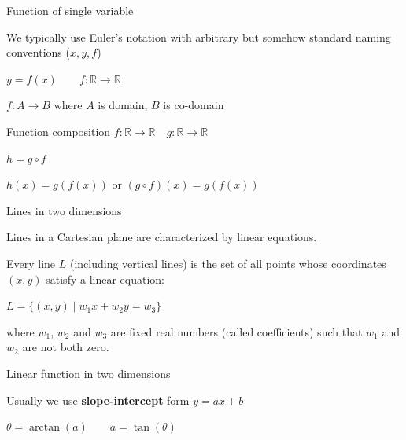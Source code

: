 \documentclass[12pt,aspectratio=169,handout]{beamer}
\begin{document}
\begin{frame}{Function of single variable}
	
	We typically use Euler's notation with arbitrary but somehow standard naming conventions ($x, y, f$)
	
	$y = f (x) \qquad f: \mathbb{R} \to \mathbb{R}$
	
	$f : A \to B$ where $A$ is domain, $B$ is co-domain
	
	\bigskip
	
	\begin{block}{Function composition}
		$f: \mathbb{R} \to \mathbb{R} \quad g: \mathbb{R} \to \mathbb{R}$
		
		$h = g \circ f$
		
		$h(x) = g(f(x))$ or $(g \circ f)(x)= g(f(x))$
	\end{block}
	
\end{frame}


\begin{frame}{Lines in two dimensions}
	
	Lines in a Cartesian plane are characterized by linear equations.
	
	Every line $L$ (including vertical lines) is the set of all points whose coordinates $(x, y)$ satisfy a linear equation:
	
	$L=\{(x,y)\mid w_1 x+ w_2 y= w_3\}$
	
	where $w_1$, $w_2$ and $w_3$ are fixed real numbers (called coefficients) such that $w_1$ and $w_2$ are not both zero.
	
\end{frame}


\begin{frame}{Linear function in two dimensions}
	
	Usually we use \textbf{slope-intercept} form $y= a x + b$
	
	
	
	$\theta = \arctan (a) \qquad a = \tan (\theta)$
	
\end{frame}
\end{document}
